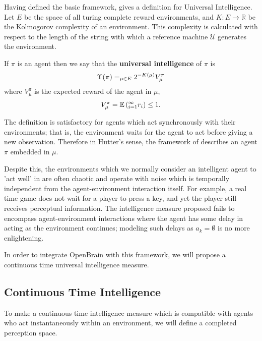 Having defined the basic framework, \cite{legg2007universal} gives a definition for Universal Intelligence. Let $E$ be the space of all turing complete reward environments, and $K: E \to  \mathbb{R}$ be the Kolmogorov complexity of an environment. This complexity is calculated with respect to the length of the string with which a reference machine $\mathcal{U}$ generates the environment.
\begin{definition} \label{uim}
	If $\pi$ is an agent then we say that the \textbf{universal intelligence} of $\pi$ is
	\begin{equation} \label{eq:uim}
		\Upsilon(\pi) = \relax_{\mu \in E}2^{-K(\mu)}V_\mu^\pi
	\end{equation}
	where $V_\mu^\pi$ is the expected reward of the agent in $\mu$,
	\begin{equation} \label{eq:exprewarduim}
		V_\mu^\pi = \mathbb{E}\left(\relax_{i=1}^\infty r_i\right) \leq 1.
	\end{equation}
\end{definition}

The definition is satisfactory for agents which act synchronously with their environments; that is, the environment waits for the agent to act before giving a new observation. Therefore in Hutter's sense, the framework of \cite{legg2007universal} describes an agent $\pi$ embedded in $\mu$.

Despite this, the environments which we normally consider an intelligent agent to 'act well' in are often chaotic and operate with noise which is temporally independent from the agent-environment interaction itself.  For example, a real time game does not wait for a player to press a key, and yet the player still receives perceptual information. The intelligence measure proposed fails to encompass agent-environment interactions where the agent has some delay in acting as the environment continues; modeling such delays as $a_k = \emptyset$ is no more enlightening.

In order to integrate OpenBrain with this framework, we will propose a continuous time universal intelligence measure.

\subsection{Continuous Time Intelligence}

To make a continuous time intelligence measure which is compatible with agents who act instantaneously within an environment, we will define a completed perception space.

